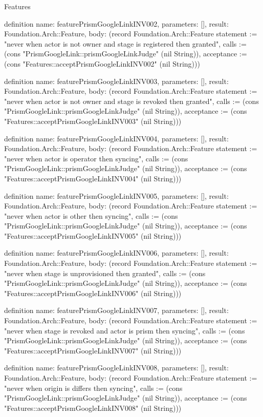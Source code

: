 \begin{lexlean}{Features}
\begin{semanticmodule}
definition{
  name: featurePrismGoogleLinkINV002,
  parameters: [],
  result: Foundation.Arch::Feature,
  body: (record Foundation.Arch::Feature {statement := "never when actor is not owner and stage is registered then granted", calls := (cons "PrismGoogleLink::prismGoogleLinkJudge" (nil String)), acceptance := (cons "Features::acceptPrismGoogleLinkINV002" (nil String))})
}

definition{
  name: featurePrismGoogleLinkINV003,
  parameters: [],
  result: Foundation.Arch::Feature,
  body: (record Foundation.Arch::Feature {statement := "never when actor is not owner and stage is revoked then granted", calls := (cons "PrismGoogleLink::prismGoogleLinkJudge" (nil String)), acceptance := (cons "Features::acceptPrismGoogleLinkINV003" (nil String))})
}

definition{
  name: featurePrismGoogleLinkINV004,
  parameters: [],
  result: Foundation.Arch::Feature,
  body: (record Foundation.Arch::Feature {statement := "never when actor is operator then syncing", calls := (cons "PrismGoogleLink::prismGoogleLinkJudge" (nil String)), acceptance := (cons "Features::acceptPrismGoogleLinkINV004" (nil String))})
}

definition{
  name: featurePrismGoogleLinkINV005,
  parameters: [],
  result: Foundation.Arch::Feature,
  body: (record Foundation.Arch::Feature {statement := "never when actor is other then syncing", calls := (cons "PrismGoogleLink::prismGoogleLinkJudge" (nil String)), acceptance := (cons "Features::acceptPrismGoogleLinkINV005" (nil String))})
}

definition{
  name: featurePrismGoogleLinkINV006,
  parameters: [],
  result: Foundation.Arch::Feature,
  body: (record Foundation.Arch::Feature {statement := "never when stage is unprovisioned then granted", calls := (cons "PrismGoogleLink::prismGoogleLinkJudge" (nil String)), acceptance := (cons "Features::acceptPrismGoogleLinkINV006" (nil String))})
}

definition{
  name: featurePrismGoogleLinkINV007,
  parameters: [],
  result: Foundation.Arch::Feature,
  body: (record Foundation.Arch::Feature {statement := "never when stage is revoked and actor is prism then syncing", calls := (cons "PrismGoogleLink::prismGoogleLinkJudge" (nil String)), acceptance := (cons "Features::acceptPrismGoogleLinkINV007" (nil String))})
}

definition{
  name: featurePrismGoogleLinkINV008,
  parameters: [],
  result: Foundation.Arch::Feature,
  body: (record Foundation.Arch::Feature {statement := "never when origin is differs then syncing", calls := (cons "PrismGoogleLink::prismGoogleLinkJudge" (nil String)), acceptance := (cons "Features::acceptPrismGoogleLinkINV008" (nil String))})
}


\end{semanticmodule}
\end{lexlean}
